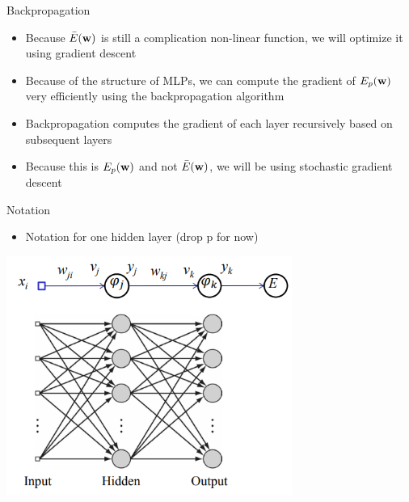 \documentclass[notes]{beamer}
\providecommand{\tightlist}{%
  \setlength{\itemsep}{0pt}\setlength{\parskip}{0pt}}
\begin{document}
\begin{frame}{Backpropagation}

\begin{itemize}
\tightlist
\item
  Because \(\bar{E} (\mathbf{w})\) is still a complication non-linear function,
  we will optimize it using gradient descent
\item
  Because of the structure of MLPs, we can compute the gradient of
  \(E_p (\mathbf{w})\) very efficiently using the backpropagation algorithm
\item
  Backpropagation computes the gradient of each layer recursively based
  on subsequent layers
\item
  Because this is \(E_p (\mathbf{w})\) and not \(\bar{E} (\mathbf{w})\), we will be
  using stochastic gradient descent
\end{itemize}

\end{frame}

\begin{frame}{Notation}

\begin{itemize}
\tightlist
\item
  Notation for one hidden layer (drop p for now)
\end{itemize}

\centering

\includegraphics[width=0.70000\textwidth]{2018-03-10-13-48-45.png} ~

\end{frame}
\end{document}
